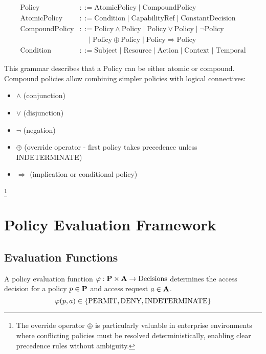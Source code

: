 \begin{align}
\text{Policy} &::= \text{AtomicPolicy} \mid \text{CompoundPolicy} \\
\text{AtomicPolicy} &::= \text{Condition} \mid \text{CapabilityRef} \mid \text{ConstantDecision} \\
\text{CompoundPolicy} &::= \text{Policy} \land \text{Policy} \mid \text{Policy} \lor \text{Policy} \mid \neg \text{Policy} \\
&\quad \mid \text{Policy} \oplus \text{Policy} \mid \text{Policy} \Rightarrow \text{Policy} \\
\text{Condition} &::= \text{Subject} \mid \text{Resource} \mid \text{Action} \mid \text{Context} \mid \text{Temporal}
\end{align}

This grammar describes that a Policy can be either atomic or compound. Compound policies allow combining simpler policies with logical connectives:
\begin{itemize}
\item $\land$ (conjunction)
\item $\lor$ (disjunction)
\item $\neg$ (negation)
\item $\oplus$ (override operator - first policy takes precedence unless INDETERMINATE)
\item $\Rightarrow$ (implication or conditional policy)
\end{itemize}

\footnote{The override operator $\oplus$ is particularly valuable in enterprise environments where conflicting policies must be resolved deterministically, enabling clear precedence rules without ambiguity.}

\newpage

\section{Policy Evaluation Framework}

\subsection{Evaluation Functions}

\begin{definition}
\label{def:policy-evaluation-function}
A policy evaluation function $\varphi: \mathbf{P} \times \mathbf{A} \to \text{Decisions}$ determines the access decision for a policy $p \in \mathbf{P}$ and access request $a \in \mathbf{A}$.
\begin{equation}
\varphi(p, a) \in \{\text{PERMIT}, \text{DENY}, \text{INDETERMINATE}\}
\end{equation}
\end{definition}

